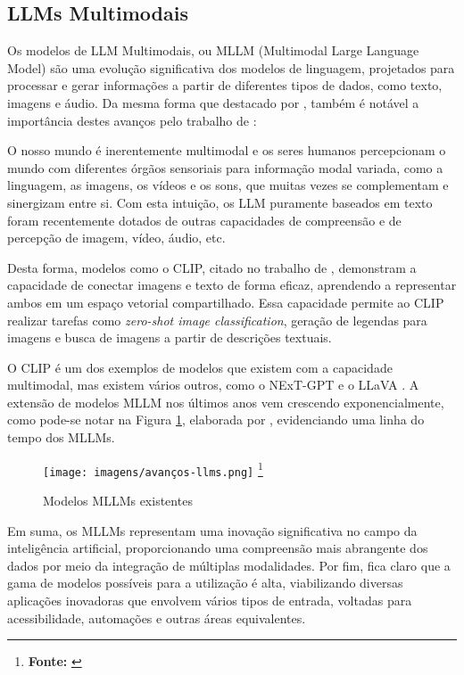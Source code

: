 \subsection{LLMs Multimodais}

Os modelos de LLM Multimodais, ou MLLM (Multimodal Large Language Model) são uma evolução significativa dos modelos de linguagem, projetados para processar e gerar informações a partir de diferentes tipos de dados, como texto, imagens e áudio. Da mesma forma que destacado por , também é notável a importância destes avanços pelo trabalho de :

\begin{citacao}
    O nosso mundo é inerentemente multimodal e os seres humanos percepcionam o mundo com diferentes órgãos sensoriais para informação modal variada, como a linguagem, as imagens, os vídeos e os sons, que muitas vezes se complementam e sinergizam entre si. Com esta intuição, os LLM puramente baseados em texto foram recentemente dotados de outras capacidades de compreensão e de percepção de imagem, vídeo, áudio, etc.
\end{citacao}

Desta forma, modelos como o CLIP, citado no trabalho de , demonstram a capacidade de conectar imagens e texto de forma eficaz, aprendendo a representar ambos em um espaço vetorial compartilhado. Essa capacidade permite ao CLIP realizar tarefas como  \textit{zero-shot image classification}, geração de legendas para imagens e  busca de imagens a partir de descrições textuais.

O CLIP é um dos exemplos de modelos que existem com a capacidade multimodal, mas existem vários outros, como o NExT-GPT \cite{wu2023} e o LLaVA \cite{liu2023}. A extensão de modelos MLLM nos últimos anos vem crescendo exponencialmente, como pode-se notar na Figura \ref{fig:3}, elaborada por , evidenciando uma linha do tempo dos MLLMs.

\begin{figure}[!h]
     \caption{Modelos MLLMs existentes}
     \centering
     \texttt{[image: imagens/avanços-llms.png]}
     \label{fig:3}
     \footnote{\textbf{Fonte:} \cite{Yin2024}}
\end{figure}

Em suma, os MLLMs representam uma inovação significativa no campo da inteligência artificial, proporcionando uma compreensão mais abrangente dos dados por meio da integração de múltiplas modalidades. Por fim, fica claro que a gama de modelos possíveis para a utilização é alta, viabilizando diversas aplicações inovadoras que envolvem vários tipos de entrada, voltadas para acessibilidade, automações e outras áreas equivalentes.

